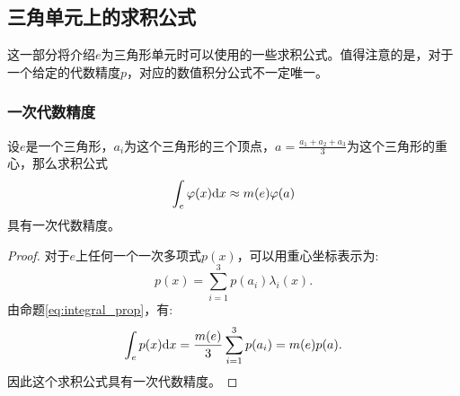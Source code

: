 \subsection{三角单元上的求积公式}
这一部分将介绍$e$为三角形单元时可以使用的一些求积公式。值得注意的是，对于一个给定的代数精度$p$，对应的数值积分公式不一定唯一。
\subsubsection{一次代数精度}
\begin{proposition}
    设$e$是一个三角形，$a_{i}$为这个三角形的三个顶点，$a=\frac{a_{1}+a_{2}+a_{3}}{3}$为这个三角形的重心，那么求积公式
    \begin{equation}
        \int_{e}\varphi(x)\mathrm{d} x\approx m(e)\varphi(a)
    \end{equation}
    具有一次代数精度。
\end{proposition}
\begin{proof}
    对于$e$上任何一个一次多项式$p(x)$，可以用重心坐标表示为:
    \begin{equation}
        p(x)=\sum_{i=1}^{3}p(a_{i})\lambda_{i}(x).
    \end{equation}
    由命题\ref{eq:integral_prop}，有:
    \begin{equation}
        \int_{e}p(x)\mathrm{d} x=\frac{m(e)}{3}\sum_{i=1}^{3}p(a_{i})=m(e)p(a).
    \end{equation}
    因此这个求积公式具有一次代数精度。
\end{proof}
